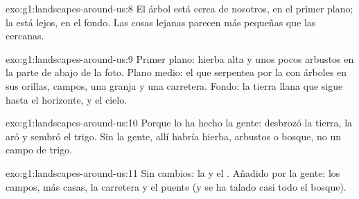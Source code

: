 \begin{solution}{exo:g1:landscapes-around-us:8}
El árbol está cerca de nosotros, en el primer plano; la  está lejos,
en el fondo. Las cosas lejanas parecen más pequeñas que las cercanas.
\end{solution}

\begin{solution}{exo:g1:landscapes-around-us:9}
Primer plano: hierba alta y unos pocos arbustos en la parte de abajo de la
foto. Plano medio: el  que serpentea por la  con árboles en sus
orillas, campos, una granja y una carretera.
Fondo: la tierra llana que sigue hasta el horizonte, y el cielo.
\end{solution}

\begin{solution}{exo:g1:landscapes-around-us:10}
Porque lo ha hecho la gente: desbrozó la tierra, la aró y sembró el trigo.
Sin la gente, allí habría hierba, arbustos o bosque, no un campo de trigo.
\end{solution}

\begin{solution}{exo:g1:landscapes-around-us:11}
Sin cambios: la  y el . Añadido por la gente: los campos, más
casas, la carretera y el puente (y se ha talado casi todo el bosque).
\end{solution}
